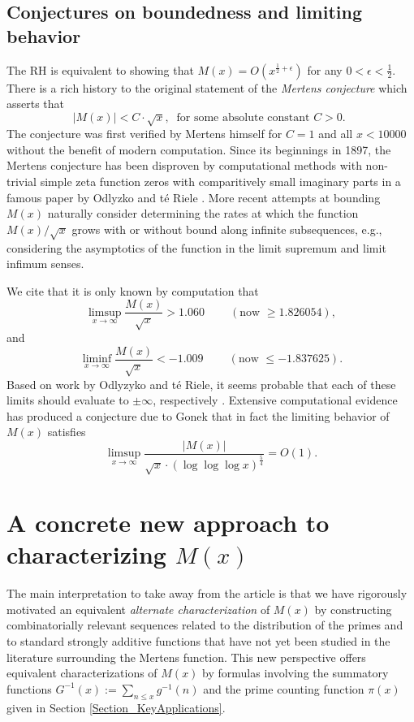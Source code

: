 \documentclass[11pt,reqno,a4letter]{article}
\numberwithin{figure}{section}
\numberwithin{table}{section}
\newcommand{\cf}{\textit{cf.\ }}
\newcommand{\seqnum}[1]{\href{http://oeis.org/#1}{\color{ProcessBlue}{\underline{#1}}}}
\theoremstyle{plain}
\numberwithin{theorem}{section}
\theoremstyle{definition}
\begin{document}
\subsection{Conjectures on boundedness and limiting behavior} 

The RH is equivalent to showing that 
$M(x) = O\left(x^{\frac{1}{2}+\epsilon}\right)$ for any 
$0 < \epsilon < \frac{1}{2}$. 
There is a rich history to the original statement of the \emph{Mertens conjecture} which 
asserts that 
\[ 
|M(x)| < C \cdot \sqrt{x},\ \text{ for some absolute constant $C > 0$. }
\] 
The conjecture was first verified by Mertens himself for $C = 1$ and all $x < 10000$ 
without the benefit of modern computation. 
Since its beginnings in 1897, the Mertens conjecture has been disproven by computational methods with
non-trivial simple zeta function zeros with comparitively small imaginary parts in a famous paper by 
Odlyzko and t\'{e} Riele \cite{ODLYZ-TRIELE}. 
More recent attempts 
at bounding $M(x)$ naturally consider determining the rates at which the function 
$M(x) / \sqrt{x}$ grows with or without bound along infinite 
subsequences, e.g., considering the asymptotics of the function in the limit supremum and 
limit infimum senses. 

We cite that it is only known by computation 
that \cite[\cf \S 4.1]{PRIMEREC} 
\cite[\cf \seqnum{A051400}; \seqnum{A051401}]{OEIS} 
\[
\limsup_{x\rightarrow\infty} \frac{M(x)}{\sqrt{x}} > 1.060\ \qquad (\text{now } \geq 1.826054), 
\] 
and 
\[ 
\liminf_{x\rightarrow\infty} \frac{M(x)}{\sqrt{x}} < -1.009\ \qquad (\text{now } \leq -1.837625). 
\] 
Based on work by Odlyzyko and t\'{e} Riele, it seems probable that 
each of these limits should evaluate to $\pm \infty$, respectively 
\cite{ODLYZ-TRIELE,MREVISITED,ORDER-MERTENSFN,HURST-2017}. 
Extensive computational evidence has produced 
a conjecture due to Gonek that in fact the limiting behavior of 
$M(x)$ satisfies \cite{NG-MERTENS}
$$\limsup_{x \rightarrow \infty} \frac{|M(x)|}{\sqrt{x} \cdot (\log\log\log x)^{\frac{5}{4}}} = O(1).$$ 

\newpage 
\section{A concrete new approach to characterizing $M(x)$} 

The main interpretation to take away from the article is that we have rigorously 
motivated an equivalent \emph{alternate characterization} of $M(x)$ by constructing 
combinatorially relevant sequences related to the distribution of the primes and to standard 
strongly additive functions 
that have not yet been studied in the literature surrounding the Mertens function. 
This new perspective offers equivalent characterizations of $M(x)$ by formulas involving the 
summatory functions $G^{-1}(x) := \sum_{n \leq x} g^{-1}(n)$ and the 
prime counting function $\pi(x)$ given in 
Section \ref{Section_KeyApplications}. 
\end{document}
